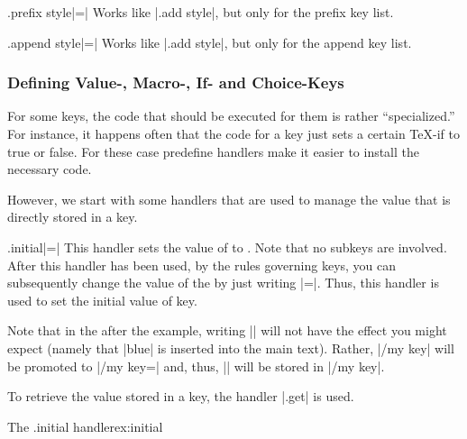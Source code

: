 \begin{handler}{.prefix style}{|=|}
  Works like |.add style|, but only for the prefix key list.
\end{handler}

\begin{handler}{.append style}{|=|}
  Works like |.add style|, but only for the append key list.
\end{handler}




\subsubsection{Defining Value-, Macro-, If- and Choice-Keys}

For some keys, the code that should be executed for them is rather
``specialized.'' For instance, it happens often that the code for a
key just sets a certain \TeX-if to true or false. For these case
predefine handlers make it easier to install the necessary code.

However, we start with some handlers that are used to manage the value
that is directly stored in a key.

\begin{handler}{.initial}{|=|}
  This handler sets the value of  to . Note that
  no subkeys are involved. After this handler has been used, by the
  rules governing keys, you can subsequently change the value of the
   by just writing |=|. Thus, this
  handler is used to set the initial value of key.


  Note that in the after the example, writing || will not
  have the effect you might expect (namely that |blue| is inserted
  into the main text). Rather, |/my key| will be promoted to
  |/my key=\pgfkeysnovalue| and, thus, |\pgfkeysnovalue| will be
  stored in |/my key|.

  To retrieve the value stored in a key, the handler |.get| is used.
\end{handler}

\begin{texexample}{The .initial handler}{ex:initial}
\end{texexample}





